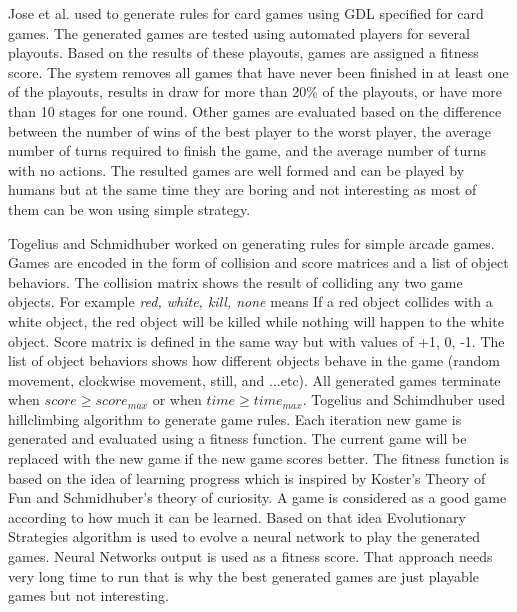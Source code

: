 Jose et al.\cite{generationCardGames} used  to generate rules for card games using GDL specified for card games. The generated games are tested using automated players for several playouts. Based on the results of these playouts, games are assigned a fitness score. The system removes all games that have never been finished in at least one of the playouts, results in draw for more than 20\% of the playouts, or have more than 10 stages for one round. Other games are evaluated based on the difference between the number of wins of the best player to the worst player, the average number of turns required to finish the game, and the average number of turns with no actions. The resulted games are well formed and can be played by humans but at the same time they are boring and not interesting as most of them can be won using simple strategy.\\\par

Togelius and Schmidhuber\cite{arcadeHillClimber} worked on generating rules for simple arcade games. Games are encoded in the form of collision and score matrices and a list of object behaviors. The collision matrix shows the result of colliding any two game objects. For example \emph{red, white, kill, none} means If a red object collides with a white object, the red object will be killed while nothing will happen to the white object. Score matrix is defined in the same way but with values of +1, 0, -1. The list of object behaviors shows how different objects behave in the game (random movement, clockwise movement, still, and ...etc). All generated games terminate when $score \geq score_{max}$ or when $time \geq time_{max}$. Togelius and Schimdhuber used hillclimbing algorithm to generate game rules. Each iteration new game is generated and evaluated using a fitness function. The current game will be replaced with the new game if the new game scores better. The fitness function is based on the idea of learning progress which is inspired by Koster's Theory of Fun\cite{theoryFun} and Schmidhuber's theory of curiosity\cite{theoryCuriousity}. A game is considered as a good game according to how much it can be learned. Based on that idea Evolutionary Strategies algorithm is used to evolve a neural network to play the generated games. Neural Networks output is used as a fitness score. That approach needs  very long time to run that is why the best generated games are just playable games but not interesting.\\\par

